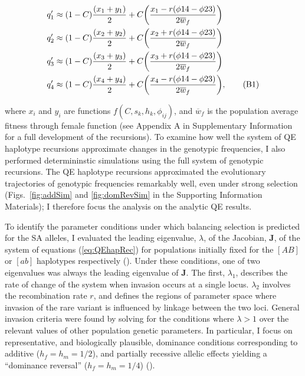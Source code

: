 \documentclass{article}
\newcommand\numberthis{\addtocounter{equation}{1}\tag{\theequation}}
\begin{document}
\begin{align*} \label{eq:QEhapRec}
	q'_1 &\approx (1 - C) \frac{(x_1 + y_1)}{2} + C \bigg( \frac{x_1 - r(\phi{14} - \phi{23})}{2 \overline{w}_f} \bigg) \\
	q'_2 &\approx (1 - C) \frac{(x_2 + y_2)}{2} + C \bigg( \frac{x_2 + r(\phi{14} - \phi{23})}{2 \overline{w}_f} \bigg) \\
	q'_3 &\approx (1 - C) \frac{(x_3 + y_3)}{2} + C \bigg( \frac{x_3 + r(\phi{14} - \phi{23})}{2 \overline{w}_f} \bigg) \\
	q'_4 &\approx (1 - C) \frac{(x_4 + y_4)}{2} + C \bigg( \frac{x_4 - r(\phi{14} - \phi{23})}{2 \overline{w}_f} \bigg), \numberthis
\end{align*}

\noindent{} where $x_i$ and $y_i$ are functions $f(C, s_k, h_k, \phi_{ij})$, and $\overline{w}_f$ is the population average fitness through female function (see Appendix A in Supplementary Information for a full development of the recursions). To examine how well the system of QE haplotype recursions approximate changes in the genotypic frequencies, I also performed determininstic simulations using the full system of genotypic recursions. The QE haplotype recursions approximated the evolutionary trajectories of genotypic frequencies remarkably well, even under strong selection (Figs.~\ref{fig:addSim} and \ref{fig:domRevSim} in the Supporting Information Materials); I therefore focus the analysis on the analytic QE results. 

To identify the parameter conditions under which balancing selection is predicted for the SA alleles, I evaluated the leading eigenvalue, $\lambda$, of the Jacobian, $\mathbf{J}$, of the system of equations (\ref{eq:QEhapRec}) for populations initially fixed for the $[AB]$ or $[ab]$ haplotypes respectively (\citealt{Prout1968, OttoDay2007}). Under these conditions, one of two eigenvalues was always the leading eigenvalue of $\mathbf{J}$. The first, $\lambda_1$, describes the rate of change of the system when invasion occurs at a single locus. $\lambda_2$ involves the recombination rate $r$, and defines the regions of parameter space where invasion of the rare variant is influenced by linkage between the two loci. General invasion criteria were found by solving for the conditions where $\lambda > 1$ over the relevant values of other population genetic parameters. In particular, I focus on representative, and biologically plausible, dominance conditions corresponding to additive ($h_f = h_m = 1/2$), and partially recessive allelic effects yielding a ``dominance reversal'' ($h_f = h_m = 1/4$) (\citealt{Kidwell1977, Prout2000, Fry2010, JordanConn2014}).
\end{document}
